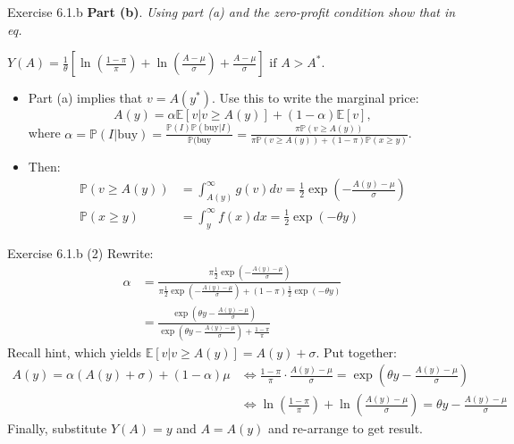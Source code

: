 \documentclass[english,10pt]{beamer}
\begin{document}
\begin{frame}{Exercise 6.1.b}
	\textbf{Part (b)}. \textit{Using part (a) and the zero-profit condition show that in eq.}
	\begin{center}
		$
		Y(A)=\frac{1}{\theta} \left[\ln \left(\frac{1-\pi}{\pi}\right) + \ln \left(\frac{A-\mu}{\sigma}\right) + \frac{A-\mu}{\sigma}\right]\text{ if } A>A^*.
		$
	\end{center}
	\smallskip
	\smallskip
	\begin{itemize}
		\item Part (a) implies that $v=A(y^*)$. Use this to write the marginal price:
		\[
		A(y) = \alpha \mathbb{E}[v|v \ge A(y)]+(1-\alpha)\mathbb{E}[v],
		\]
		where $\alpha=\mathbb{P}(I|\text{buy})=\frac{\mathbb{P}(I)\mathbb{P}(\text{buy}|I) }{\mathbb{P}(\text{buy}}=\frac{\pi \mathbb{P}(v \ge A(y))}{\pi \mathbb{P}(v \ge A(y))+(1-\pi)\mathbb{P}(x \ge y)}$.
		\item Then:
		\begin{align*}
		\mathbb{P}(v \ge A(y)) 	&=\int_{A(y)}^\infty g(v) dv = \frac{1}{2} \exp(-\frac{A(y)-\mu}{\sigma}) \\
		\mathbb{P}(x \ge y)	&=\int_y^\infty f(x) dx = \frac{1}{2}\exp(-\theta y)
		\end{align*}
	\end{itemize}
\end{frame}


\begin{frame}{Exercise 6.1.b (2)}
	Rewrite:
	\begin{align*}
	\alpha 
	& =\frac{\pi \frac{1}{2} \exp(-\frac{A(y)-\mu}{\sigma})}{\pi \frac{1}{2} \exp(-\frac{A(y)-\mu}{\sigma})+(1-\pi)\frac{1}{2}\exp(-\theta y)} \\
	& = \frac{\exp(\theta y-\frac{A(y)-\mu}{\sigma})}{\exp(\theta y-\frac{A(y)-\mu}{\sigma})+\frac{1-\pi}{\pi}} 
	\end{align*}
	Recall hint, which yields $\mathbb{E}[v|v \ge A(y)]=A(y)+\sigma$. Put together:
	\begin{align*}
	A(y)=\alpha(A(y)+\sigma)+(1-\alpha) \mu & \Leftrightarrow \frac{1-\pi}{\pi}\cdot \frac{A(y)-\mu}{\sigma}=\exp(\theta y-\frac{A(y)-\mu}{\sigma})  \\
	& \Leftrightarrow \ln( \frac{1-\pi}{\pi}) + \ln (\frac{A(y)-\mu}{\sigma})=\theta y-\frac{A(y)-\mu}{\sigma} 
	\end{align*}
	Finally, substitute $Y(A)=y$ and $A=A(y)$ and re-arrange to get result.
\end{frame}
\end{document}
